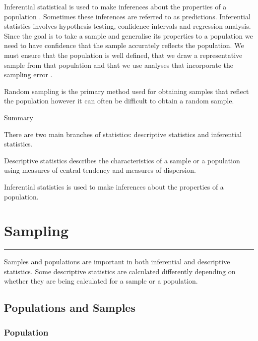 \documentclass[
]{book}
\begin{document}
Inferential statistical is used to make inferences about the properties of a population \citep{Witte2017}. Sometimes these inferences are referred to as predictions. Inferential statistics involves hypothesis testing, confidence intervals and regression analysis. Since the goal is to take a sample and generalise its properties to a population we need to have confidence that the sample accurately reflects the population. We must ensure that the population is well defined, that we draw a representative sample from that population and that we use analyses that incorporate the sampling error \citep{Frost2019}.

Random sampling is the primary method used for obtaining samples that reflect the population however it can often be difficult to obtain a random sample.

Summary

There are two main branches of statistics: descriptive statistics and inferential statistics.

Descriptive statistics describes the characteristics of a sample or a population using measures of central tendency and measures of dispersion.

Inferential statistics is used to make inferences about the properties of a population.

\hypertarget{sampling}{%
\chapter{Sampling}\label{sampling}}

\begin{center}\rule{0.5\linewidth}{0.5pt}\end{center}

Samples and populations are important in both inferential and descriptive statistics. Some descriptive statistics are calculated differently depending on whether they are being calculated for a sample or a population.

\hypertarget{populations-and-samples}{%
\section{Populations and Samples}\label{populations-and-samples}}

\hypertarget{population}{%
\subsection{Population}\label{population}}
\end{document}
